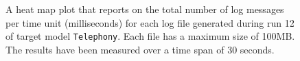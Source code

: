 \begin{figure}[htbp]
\centering
\begin{minipage}{1\textwidth}
  \centering
\end{minipage}
\caption{A heat map plot that reports on the total number of log messages per time unit (milliseconds) for each log file generated during run 12 of target model \texttt{Telephony}. Each file has a maximum size of 100MB. The results have been measured over a time span of 30 seconds.}
\label{figure:throughput_sum_random_det_telephony_12}
\end{figure}